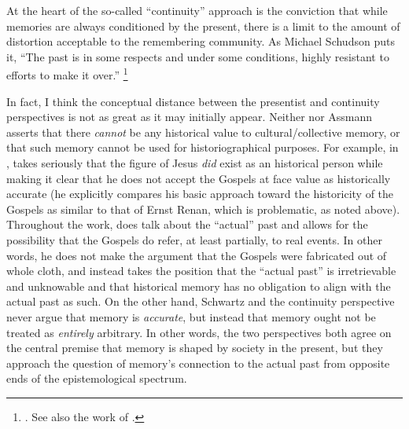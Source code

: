 At the heart of the so-called ``continuity'' approach is the conviction that while memories are always conditioned by the present, there is a limit to the amount of distortion acceptable to the remembering community. As Michael Schudson puts it, ``The past is in some respects and under some conditions, highly resistant to efforts to make it over.''%
    \footnote{%
        \Cite[107]{schudson_communication1989}. See also the work of 
        \cite{molden_ms2016}.}

In fact, I think the conceptual distance between the presentist and continuity perspectives is not as great as it may initially appear. Neither \halbwachs nor Assmann asserts that there \emph{cannot} be any historical value to cultural/collective memory, or that such memory cannot be used for historiographical purposes. For example, in , \halbwachs takes seriously that the figure of Jesus \emph{did} exist as an historical person while making it clear that he does not accept the Gospels at face value as historically accurate (he explicitly compares his basic approach toward the historicity of the Gospels as similar to that of Ernst Renan, which is problematic, as noted above).%
    \autocite[205--206]{halbwachs1992}
Throughout the work, \halbwachs does talk about the ``actual'' past and allows for the possibility that the Gospels do refer, at least partially, to real events. In other words, he does not make the argument that the Gospels were fabricated out of whole cloth, and instead takes the position that the ``actual past'' is irretrievable and unknowable and that historical memory has no obligation to align with the actual past as such. On the other hand, Schwartz and the continuity perspective never argue that memory is \emph{accurate}, but instead that memory ought not be treated as \emph{entirely} arbitrary. In other words, the two perspectives both agree on the central premise that memory is shaped by society in the present, but they approach the question of memory's connection to the actual past from opposite ends of the epistemological spectrum.  

